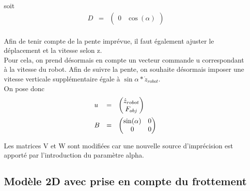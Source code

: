 \documentclass[12pt,twoside,a4paper]{article}
\begin{document}
soit 
$$
\begin{array}{lll}
D &=& \begin{pmatrix} 0 & \cos(\alpha) \end{pmatrix} \\ 
\end{array}
$$

Afin de tenir compte de la pente imprévue, il faut également ajuster le déplacement et la vitesse selon z. \\
Pour cela, on prend désormais en compte un vecteur commande u correspondant à la vitesse du robot. Afin de suivre la pente, on souhaite désormais imposer une vitesse verticale supplémentaire égale à $\sin{\alpha}*\dot{z}_{robot}$. \\
On pose donc
$$ 
\begin{array}{lll}
u &=& \begin{pmatrix} \dot{z}_{robot} \\ F_{obj}\end{pmatrix} \\
B &=& \begin{pmatrix}	\sin(\alpha) & 0 \\ 0 & 0  \end{pmatrix} \rule{0pt}{20pt}\\
\end{array}
$$



\noindent Les matrices V et W sont modifiées car une nouvelle source d'imprécision est apporté par l'introduction du paramètre alpha. 


\subsection{Modèle 2D avec prise en compte du frottement}
\end{document}

